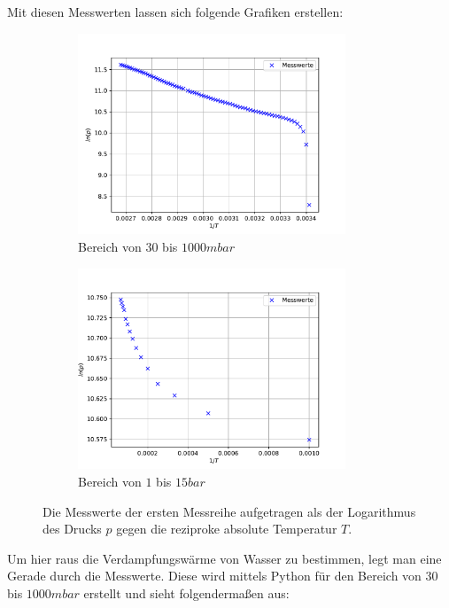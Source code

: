 Mit diesen Messwerten lassen sich folgende Grafiken erstellen:
\begin{figure}[H]
  \begin{subfigure}{0.48\textwidth}
      \includegraphics[height=6cm]{python/plota.pdf}
    \caption{Bereich von $30$ bis $1000 mbar$}
    \label{fig:MesswerteKlein}
  \end{subfigure}
  \hfill
  \begin{subfigure}{0.48\textwidth}
    \includegraphics[height=6cm]{python/plotb.pdf}
    \caption{Bereich von $1$ bis $15 bar$}
    \label{fig:MesswerteGross}
  \end{subfigure}
  \caption{Die Messwerte der ersten Messreihe aufgetragen als der Logarithmus des Drucks $p$
  gegen die reziproke absolute Temperatur $T$.}
  \label{fig:Teila}
\end{figure}
\newpage
Um hier raus die Verdampfungswärme von Wasser zu bestimmen, legt man eine Gerade durch die Messwerte.
Diese wird mittels Python für den Bereich von $30$ bis $1000 mbar$ erstellt und sieht folgendermaßen aus: \\

